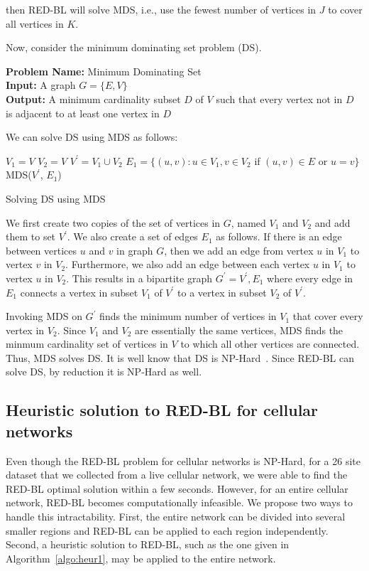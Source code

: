 then RED-BL will solve MDS, i.e., use the fewest number of vertices in $J$ to cover all vertices in $K$.

Now, consider the minimum dominating set problem (DS).
\medskip

\noindent
\textbf{Problem Name:} Minimum Dominating Set\\
\textbf{Input:} A graph $G=\{E,V\}$\\
\textbf{Output:} A minimum cardinality subset $D$ of $V$ such that every vertex not in $D$ is adjacent to at least one vertex in $D$

We can solve DS using MDS as follows:
\IncMargin{1em}
\LinesNumbered
\begin{algorithm}
 $V_1 = V$\;
 $V_2 = V$\;
 $V^{\prime} = V_1 \cup V_2$\;
 $E_1 = \{(u, v): u \in V_1, v \in V_2$ if $(u, v) \in E$ or $u = v\}$\;
 MDS($V^{\prime}$, $E_1$)\;
\caption{Solving DS using MDS}
\label{algo:proof}
\end{algorithm}
\DecMargin{1em}

We first create two copies of the set of vertices in $G$, named $V_1$ and $V_2$ and add them to set $V^{\prime}$. We also create a set of edges $E_1$ as follows. If there is an edge between vertices $u$ and $v$ in graph $G$, then we add an edge from vertex $u$ in $V_1$ to vertex $v$ in $V_2$. Furthermore, we also add an edge between each vertex $u$ in $V_1$ to vertex $u$ in $V_2$. This results in a bipartite graph $G^{\prime}={V^{\prime}, E_1}$ where every edge in $E_1$ connects a vertex in subset $V_1$ of $V^{\prime}$ to a vertex in subset $V_2$ of $V^{\prime}$.

Invoking MDS on $G^{\prime}$ finds the minimum number of vertices in $V_1$ that cover every vertex in $V_2$. Since $V_1$ and $V_2$ are essentially the same vertices, MDS finds the minmum cardinality set of vertices in $V$ to which all other vertices are connected. Thus, MDS solves DS. It is well know that DS is NP-Hard~\cite{Liedloff:2008:FDS:1390853.1390871}. Since RED-BL can solve DS, by reduction it is NP-Hard as well.

\subsection{Heuristic solution to RED-BL for cellular networks}
\label{subsec:heuristics} Even though the RED-BL problem for cellular networks is NP-Hard, for a 26 site dataset that we collected from a live cellular network, we were able to find the RED-BL optimal solution within a few seconds.
However, for an entire cellular network, RED-BL becomes computationally infeasible.
We propose two ways to handle this intractability. First, the entire network can be divided into several smaller regions and RED-BL can be applied to each region independently.
Second, a heuristic solution to RED-BL, such as the one given in Algorithm~\ref{algo:heur1}, may be applied to the entire network.

